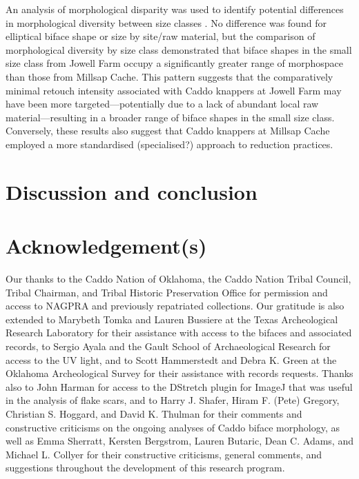 \documentclass[]{interact}
\theoremstyle{plain}%
\theoremstyle{definition}
\theoremstyle{remark}
\begin{document}
An analysis of morphological disparity was used to identify potential
differences in morphological diversity between size classes
\citep{RN11107,RN7041,RN5694}. No difference was found for elliptical
biface shape or size by site/raw material, but the comparison of
morphological diversity by size class demonstrated that biface shapes in
the small size class from Jowell Farm occupy a significantly greater
range of morphospace than those from Millsap Cache. This pattern
suggests that the comparatively minimal retouch intensity associated
with Caddo knappers at Jowell Farm may have been more
targeted---potentially due to a lack of abundant local raw
material---resulting in a broader range of biface shapes in the small
size class. Conversely, these results also suggest that Caddo knappers
at Millsap Cache employed a more standardised (specialised?) approach to
reduction practices.

\hypertarget{discussion-and-conclusion}{%
\section{Discussion and conclusion}\label{discussion-and-conclusion}}

\hypertarget{acknowledgements}{%
\section*{Acknowledgement(s)}\label{acknowledgements}}

Our thanks to the Caddo Nation of Oklahoma, the Caddo Nation Tribal
Council, Tribal Chairman, and Tribal Historic Preservation Office for
permission and access to NAGPRA and previously repatriated collections.
Our gratitude is also extended to Marybeth Tomka and Lauren Bussiere at
the Texas Archeological Research Laboratory for their assistance with
access to the bifaces and associated records, to Sergio Ayala and the
Gault School of Archaeological Research for access to the UV light, and
to Scott Hammerstedt and Debra K. Green at the Oklahoma Archeological
Survey for their assistance with records requests. Thanks also to John
Harman for access to the DStretch plugin for ImageJ that was useful in
the analysis of flake scars, and to Harry J. Shafer, Hiram F. (Pete)
Gregory, Christian S. Hoggard, and David K. Thulman for their comments
and constructive criticisms on the ongoing analyses of Caddo biface
morphology, as well as Emma Sherratt, Kersten Bergstrom, Lauren Butaric,
Dean C. Adams, and Michael L. Collyer for their constructive criticisms,
general comments, and suggestions throughout the development of this
research program.
\end{document}
